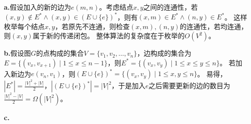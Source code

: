 \begin{solution}
    \textbf{a.}假设加入的新的边为$e(m,n)$。考虑结点$x,y$之间的连通性，若
    $(x,y)\notin E^* \wedge (x,y)\in (E\cup \{e\})^*$，则有$(x,m)\in E^* \wedge (n,y) \in E^*$。
    这样枚举每个结点$x,y$，若原先不连通，则检查$(x,m),(n,y)$的连通性，若均连通，则$(x,y)$属于新的传递闭包。
    整体算法的复杂度在于枚举的$O(V^2)$。

    \textbf{b.}假设图$G$的点构成的集合$V=\{v_1,v_2,\ldots,v_n\}$，边构成的集合为
    $E=\{(v_{x},v_{x+1})\mid 1 \le x \le n-1\}$，则$E^*=\{(v_{x},v_{y})\mid 1\le x \le y\le n\}$。
    若加入新边为$e(v_n,v_1)$，则$(E\cup\{e\})^*=\{(v_{x},v_{y})\mid 1\le x,y\le n\}$。
    易得，$|E^*|=\frac{|V|^2+|V|}{2}$，$|(E\cup\{e\})^*|=|V|^2$，于是加入$e$之后需要更新的边的数目为
    $\frac{|V|^2-|V|}{2}=\Omega(|V|^2)$。

    \textbf{c.}

\end{solution}